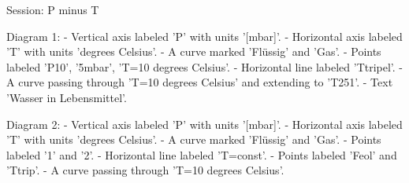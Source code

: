 Session: P minus T

Diagram 1:
- Vertical axis labeled 'P' with units '[mbar]'.
- Horizontal axis labeled 'T' with units 'degrees Celsius'.
- A curve marked 'Flüssig' and 'Gas'.
- Points labeled 'P10', '5mbar', 'T=10 degrees Celsius'.
- Horizontal line labeled 'Ttripel'.
- A curve passing through 'T=10 degrees Celsius' and extending to 'T251'.
- Text 'Wasser in Lebensmittel'.

Diagram 2:
- Vertical axis labeled 'P' with units '[mbar]'.
- Horizontal axis labeled 'T' with units 'degrees Celsius'.
- A curve marked 'Flüssig' and 'Gas'.
- Points labeled '1' and '2'.
- Horizontal line labeled 'T=const'.
- Points labeled 'Feol' and 'Ttrip'.
- A curve passing through 'T=10 degrees Celsius'.
